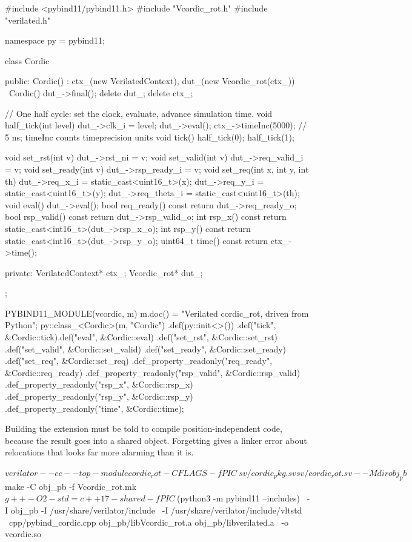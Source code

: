 \begin{cppcode}[caption={A \code{pybind11} wrapper around the Verilated model
(\file{pybind\_cordic.cpp}).},label={lst:python:pybind}]
#include <pybind11/pybind11.h>
#include "Vcordic_rot.h"
#include "verilated.h"

namespace py = pybind11;

class Cordic {
 public:
  Cordic() : ctx_(new VerilatedContext), dut_(new Vcordic_rot(ctx_)) {}
  ~Cordic() { dut_->final(); delete dut_; delete ctx_; }

  // One half cycle: set the clock, evaluate, advance simulation time.
  void half_tick(int level) {
    dut_->clk_i = level;
    dut_->eval();
    ctx_->timeInc(5000);   // 5 ns; timeInc counts timeprecision units
  }
  void tick() { half_tick(0); half_tick(1); }

  void set_rst(int v)   { dut_->rst_ni = v; }
  void set_valid(int v) { dut_->req_valid_i = v; }
  void set_ready(int v) { dut_->rsp_ready_i = v; }
  void set_req(int x, int y, int th) {
    dut_->req_x_i     = static_cast<uint16_t>(x);
    dut_->req_y_i     = static_cast<uint16_t>(y);
    dut_->req_theta_i = static_cast<uint16_t>(th);
  }
  void eval() { dut_->eval(); }
  bool req_ready() const { return dut_->req_ready_o; }
  bool rsp_valid() const { return dut_->rsp_valid_o; }
  int  rsp_x() const { return static_cast<int16_t>(dut_->rsp_x_o); }
  int  rsp_y() const { return static_cast<int16_t>(dut_->rsp_y_o); }
  uint64_t time() const { return ctx_->time(); }

 private:
  VerilatedContext* ctx_;
  Vcordic_rot* dut_;
};

PYBIND11_MODULE(vcordic, m) {
  m.doc() = "Verilated cordic_rot, driven from Python";
  py::class_<Cordic>(m, "Cordic")
      .def(py::init<>())
      .def("tick", &Cordic::tick).def("eval", &Cordic::eval)
      .def("set_rst", &Cordic::set_rst)
      .def("set_valid", &Cordic::set_valid)
      .def("set_ready", &Cordic::set_ready)
      .def("set_req", &Cordic::set_req)
      .def_property_readonly("req_ready", &Cordic::req_ready)
      .def_property_readonly("rsp_valid", &Cordic::rsp_valid)
      .def_property_readonly("rsp_x", &Cordic::rsp_x)
      .def_property_readonly("rsp_y", &Cordic::rsp_y)
      .def_property_readonly("time", &Cordic::time);
}
\end{cppcode}

\begin{tipbox}{Building the extension}
 must be told to compile position-independent code, because
the result goes into a shared object. Forgetting  gives
a linker error about  relocations that looks far
more alarming than it is.
\begin{shcode}
$ verilator --cc --top-module cordic_rot -CFLAGS -fPIC \
      sv/cordic_pkg.sv sv/cordic_rot.sv --Mdir obj_pb
$ make -C obj_pb -f Vcordic_rot.mk
$ g++ -O2 -std=c++17 -shared -fPIC \
      $(python3 -m pybind11 --includes) \
      -I obj_pb -I /usr/share/verilator/include \
      -I /usr/share/verilator/include/vltstd \
      cpp/pybind_cordic.cpp obj_pb/libVcordic_rot.a obj_pb/libverilated.a \
      -o vcordic.so
\end{shcode}
\end{tipbox}

